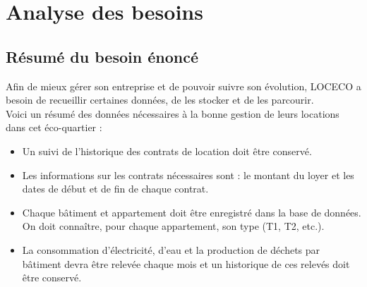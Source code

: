 \chapter{Analyse des besoins}

\section{Résumé du besoin énoncé}

Afin de mieux gérer son entreprise et de pouvoir suivre son évolution, LOCECO a besoin de recueillir certaines données, de les stocker et de les parcourir. \\

Voici un résumé des données nécessaires à la bonne gestion de leurs locations dans cet éco-quartier :

\begin{itemize}
\item Un suivi de l'historique des contrats de location doit être conservé.
\item Les informations sur les contrats nécessaires sont : le montant du loyer et les dates de début et de fin de chaque contrat.
\item Chaque bâtiment et appartement doit être enregistré dans la base de données. On doit connaître, pour chaque appartement, son type (T1, T2, etc.).
\item La consommation d'électricité, d'eau et la production de déchets par bâtiment devra être relevée chaque mois et un historique de ces relevés doit être conservé.
\end{itemize}